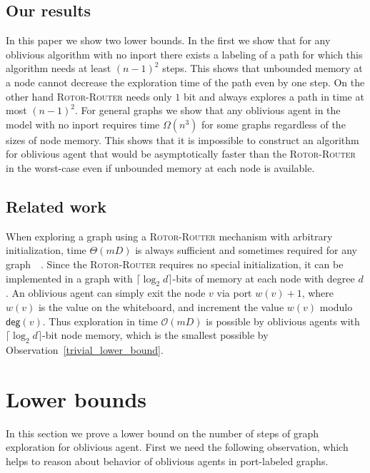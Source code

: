 \documentclass{article}[11pt,letter]
\newcommand{\bigo}{\mathcal{O}}
\newcommand{\vdeg}{\ensuremath{\mathsf{deg}}}
\newcommand{\RR}{{\textsc{Rotor-Router}}\xspace}
\begin{document}
\subsection{Our results}
In this paper we show two lower bounds. In the first we show that for any oblivious algorithm with no inport there exists a labeling of a path for which this algorithm needs at least $(n-1)^2$ steps. This shows that unbounded memory at a node cannot decrease the exploration time of the path even by one step. On the other hand \RR needs only $1$ bit and always explores a path in time at most $(n-1)^2$.
For general graphs we show that any oblivious agent in the model with no inport requires time $\Omega(n^3)$ for some graphs regardless of the sizes of node memory. This shows that it is impossible to construct an algorithm for oblivious agent that would be asymptotically faster than the \RR in the worst-case even if unbounded memory at each node is available.






\subsection{Related work}


When exploring a graph using a \RR mechanism with arbitrary initialization, time $\Theta(mD)$ is always sufficient and sometimes required for any graph~\cite{Yanovski}~\cite{LockIn}. Since the \RR requires no special initialization, it can be implemented in a graph with $\lceil\log_2 d\rceil$-bits of memory at each node with degree $d$. An oblivious agent can simply exit the node $v$ via port $w(v)+1$, where $w(v)$ is the value on the whiteboard, and increment the value $w(v)$ modulo $\vdeg(v)$. Thus exploration in time $\bigo(mD)$ is possible by oblivious agents with $\lceil\log_2 d\rceil$-bit node memory, which is the smallest possible by Observation~\ref{trivial_lower_bound}.



\section{Lower bounds}
\label{sec:lower}
In this section we prove a lower bound on the number of steps of graph exploration for oblivious agent. First we need the following observation, which helps to reason about behavior of oblivious agents in port-labeled graphs.
\end{document}
